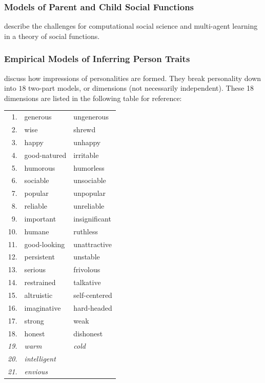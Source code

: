 \subsubsection{Models of Parent and Child Social Functions}
\cite{castelfranchi2001tsf} describe the challenges for computational social science and multi-agent learning in a theory of social functions.


\subsubsection{Empirical Models of Inferring Person Traits}

\cite{asch2005fiop} discuss how impressions of personalities are formed.
They break personality down into $18$ two-part models, or dimensions (not necessarily independent).
These 18 dimensions are listed in the following table for reference:


\begin{tabular}{rll}
  1.         & generous           & ungenerous \\
  2.         & wise               & shrewd \\
  3.         & happy              & unhappy \\
  4.         & good-natured       & irritable \\
  5.         & humorous           & humorless \\
  6.         & sociable           & unsociable \\
  7.         & popular            & unpopular \\
  8.         & reliable           & unreliable \\
  9.         & important          & insignificant \\
  10.        & humane             & ruthless \\
  11.        & good-looking       & unattractive \\
  12.        & persistent         & unstable \\
  13.        & serious            & frivolous \\
  14.        & restrained         & talkative \\
  15.        & altruistic         & self-centered \\
  16.        & imaginative        & hard-headed \\
  17.        & strong             & weak \\
  18.        & honest             & dishonest \\
  \emph{19.} & \emph{warm}        & \emph{cold} \\
  \emph{20.} & \emph{intelligent} & ~ \\
  \emph{21.} & \emph{envious}     & ~
\end{tabular}	      

